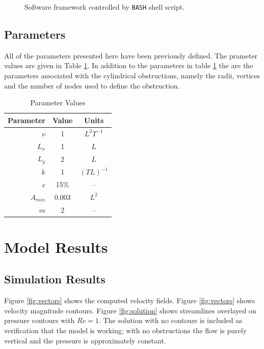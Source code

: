 \documentclass[wrr]{agutex}  %
\begin{document}
\begin{article}
\begin{figure}[h]
\caption{Software framework controlled by {\tt BASH} shell script.}\label{fig:sf}
\end{figure}


\subsection{Parameters}
All of the parameters presented here have been previously defined.  The prameter values are given in Table \ref{tbl:parms}.  In addition to the parameters in table \ref{tbl:parms} the are the parameters associated with the cylindrical obstructions, namely the radii, vertices  and the number of nodes used to define the obstruction.
\begin{table}[h]
\flushleft
\caption{Parameter Values}\label{tbl:parms}
\begin{tabular}{rcc}
\toprule
Parameter & Value & Units\\
\midrule
$\nu$ & 1 & $L^2T^{-1}$\\
$L_x$ & 1 & $L$\\
$L_y$ & 2 & $L$\\
$k$ & 1 & $(TL)^{-1}$\\
$\epsilon$ & 15\% & --\\
$A_{min}$ & 0.003 & $L^2$\\
$m$ & 2 & --\\
\bottomrule
\end{tabular}
\end{table}


\section{Model Results}

\subsection{Simulation Results}
Figure \ref{fig:vectors} shows the computed velocity fields.  Figure \ref{fig:vectors} shows velocity magnitude contours.  Figure \ref{fig:solution} shows streamlines overlayed on pressure contours with $Re=1$.  The solution with no contours is included as verification that the model is working; with no obstructions the flow is purely vertical and the pressure is approximately constant.  


\end{article}
\end{document}
